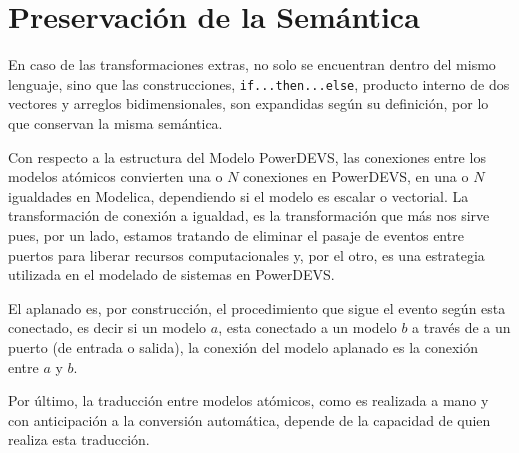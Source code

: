 \section{Preservación de la Semántica}

	En caso de las transformaciones extras, no solo se encuentran dentro del mismo lenguaje, sino que las construcciones, \texttt{if...then...else}, 
		producto interno de dos vectores y arreglos bidimensionales, son expandidas según su definición, por lo que conservan la misma semántica.

	Con respecto a la estructura del Modelo PowerDEVS, las conexiones entre los modelos atómicos convierten una o $N$ conexiones en PowerDEVS, en una o $N$
	 igualdades en Modelica, dependiendo si el modelo es escalar o vectorial. La transformación de conexión a igualdad, es la transformación que más 
	nos sirve pues, por un lado, estamos tratando de eliminar el pasaje de eventos entre puertos para liberar recursos computacionales y, por el otro, 
	es una estrategia utilizada en el modelado de sistemas en PowerDEVS.

	El aplanado es, por construcción, el procedimiento que sigue el evento según esta conectado, es decir si un modelo $a$, esta conectado
	a un modelo $b$ a través de a un puerto (de entrada o salida), la conexión del modelo aplanado es la conexión entre $a$ y $b$. 

	Por último, la traducción entre modelos atómicos, como es realizada a mano y con anticipación a la conversión automática, depende de la capacidad de 
	quien realiza esta traducción.
